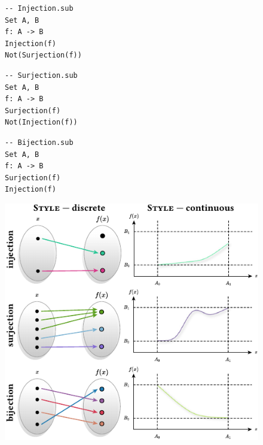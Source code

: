 \begin{figure}
   \centering
   \begin{minipage}[t]{0.33\columnwidth}
      \begin{mdframed}[style=SUBCode]
      \begin{lstlisting}[language=Sub-ST,escapechar=@,numbers=none]
-- Injection.sub
Set A, B
f: A -> B
Injection(f)
Not(Surjection(f))\end{lstlisting}
      \end{mdframed}
   \end{minipage}\hfill\begin{minipage}[t]{0.32\columnwidth}
      \begin{mdframed}[style=SUBCode]
      \begin{lstlisting}[language=Sub-ST,escapechar=@,numbers=none]
-- Surjection.sub
Set A, B
f: A -> B
Surjection(f)
Not(Injection(f))\end{lstlisting}
      \end{mdframed}
   \end{minipage}\hfill\begin{minipage}[t]{0.30\columnwidth}
      \begin{mdframed}[style=SUBCode]
      \begin{lstlisting}[language=Sub-ST,escapechar=@,numbers=none]
-- Bijection.sub
Set A, B
f: A -> B
Surjection(f)
Injection(f)\end{lstlisting}
      \end{mdframed}
   \end{minipage}
   \begin{minipage}[t]{\columnwidth}    
   \centering
   \includegraphics[scale=1.5]{assets/penrose/func-continuous-discrete-vert.pdf}

\end{minipage}
\end{figure}
